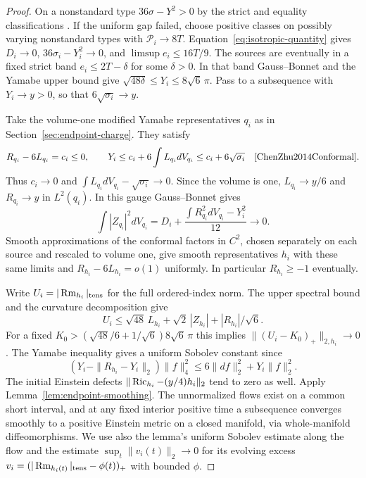 \begin{proof}
On a nonstandard type \(36\sigma-Y^2>0\) by the strict and
equality classifications \cite[Theorems~1.4 and 1.6]{ChenZhu2014Conformal}.
If the uniform gap failed, choose positive classes on possibly
varying nonstandard types with \(\mathcal P_i\to8T\).
Equation~\eqref{eq:isotropic-quantity} gives
\(D_i\to0\), \(36\sigma_i-Y_i^2\to0\), and
\(\limsup e_i\le16T/9\). The sources are eventually in a fixed
strict band \(e_i\le2T-\delta\) for some \(\delta>0\).
In that band Gauss--Bonnet and the Yamabe upper bound give
\(\sqrt{48\delta}\le Y_i\le8\sqrt6\,\pi\). Pass to a subsequence
with \(Y_i\to y>0\), so that \(6\sqrt{\sigma_i}\to y\).

Take the volume-one modified Yamabe representatives \(q_i\)
as in Section~\ref{sec:endpoint-charge}. They satisfy
\[
 R_{q_i}-6L_{q_i}=c_i\le0,\qquad
 Y_i\le c_i+6\int L_{q_i}dV_{q_i}\le c_i+6\sqrt{\sigma_i}
 \quad\cite[Lemma~2.1 and Theorem~1.7]{ChenZhu2014Conformal}.
\]
Thus \(c_i\to0\) and \(\int L_{q_i}dV_{q_i}-\sqrt{\sigma_i}\to0\).
Since the volume is one, \(L_{q_i}\to y/6\) and \(R_{q_i}\to y\)
in \(L^2(q_i)\). In this gauge Gauss--Bonnet gives
\[
 \int |Z_{q_i}|^2dV_{q_i}
 =D_i+\frac{\int R_{q_i}^2dV_{q_i}-Y_i^2}{12}\longrightarrow0.
\]
Smooth approximations of the conformal factors in \(C^2\),
chosen separately on each source and rescaled to volume one,
give smooth representatives \(h_i\) with these same limits and
\(R_{h_i}-6L_{h_i}=o(1)\) uniformly. In particular \(R_{h_i}\ge-1\)
eventually.

Write \(U_i=|\operatorname{Rm}_{h_i}|_{\rm tens}\) for the full ordered-index
norm. The upper spectral bound and the curvature decomposition give
\[
 U_i\le\sqrt{48}\,L_{h_i}+\sqrt2\,|Z_{h_i}|+|R_{h_i}|/\sqrt6.
\]
For a fixed \(K_0>(\sqrt{48}/6+1/\sqrt6)8\sqrt6\,\pi\) this
implies \(\|(U_i-K_0)_+\|_{2,h_i}\to0\). The Yamabe inequality
gives a uniform Sobolev constant since
\[
 (Y_i-\|R_{h_i}-Y_i\|_2)\|f\|_4^2
 \le6\|df\|_2^2+Y_i\|f\|_2^2.
\]
The initial Einstein defects \(\|\operatorname{Ric}_{h_i}-(y/4)h_i\|_2\)
tend to zero as well. Apply Lemma~\ref{lem:endpoint-smoothing}.
The unnormalized flows exist on a common short interval,
and at any fixed interior positive time a subsequence converges
smoothly to a positive Einstein metric on a closed manifold,
via whole-manifold diffeomorphisms. We use also the lemma's
uniform Sobolev estimate along the flow and the estimate
\(\sup_t\|v_i(t)\|_2\to0\) for its evolving excess
\(v_i=(|\operatorname{Rm}_{h_i(t)}|_{\rm tens}-\phi(t))_+\) with bounded \(\phi\).


\end{proof}
